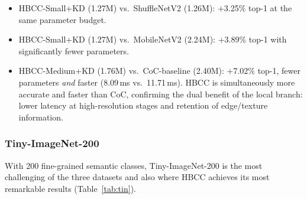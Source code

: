 \documentclass[conference]{IEEEtran}
\begin{document}
\begin{itemize}
  \item HBCC-Small+KD (1.27M) vs.\ ShuffleNetV2 (1.26M):
        $+$3.25\% top-1 at the same parameter budget.
  \item HBCC-Small+KD (1.27M) vs.\ MobileNetV2 (2.24M):
        $+$3.89\% top-1 with significantly fewer parameters.
  \item HBCC-Medium+KD (1.76M) vs.\ CoC-baseline (2.40M):
        $+$7.02\% top-1, fewer parameters \emph{and} faster
        (8.09\,ms vs.\ 11.71\,ms). HBCC is simultaneously more
        accurate and faster than CoC, confirming the dual benefit
        of the local branch: lower latency at high-resolution
        stages and retention of edge/texture information.
\end{itemize}

\begin{table}[ht!]
  \caption{Results on CIFAR-10. \textbf{Bold}: best among lightweight
           models. \texttt{+KD}: trained with knowledge distillation.}
  \label{tab:cifar10}
  \centering
  \renewcommand{\arraystretch}{1.15}
\end{table}

\subsubsection{Tiny-ImageNet-200}

With 200 fine-grained semantic classes, Tiny-ImageNet-200 is the most
challenging of the three datasets and also where HBCC achieves its
most remarkable results (Table~\ref{tab:tin}).
\end{document}

